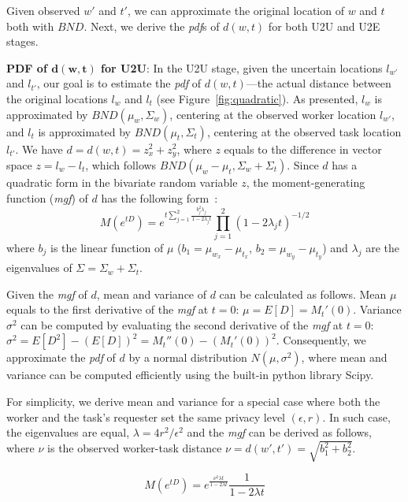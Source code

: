 \documentclass{USC-Thesis}
\numberwithin{equation}{chapter}
\begin{document}
Given observed $w'$ and $t'$, we can approximate the original location of $w$ and $t$ both with $\mathit{BND}$. Next, we derive the \emph{pdf}s of $d(w,t)$ for both U2U and U2E stages.

\textbf{PDF of $\mathbf{d(w,t)}$ for U2U}: In the U2U stage, given the uncertain locations $l_{w'}$ and $l_{t'}$, our goal is to estimate the \emph{pdf} of $d(w,t)$---the actual distance between the original locations $l_w$ and $l_t$  (see Figure~\ref{fig:quadratic}). As presented, $l_w$ is approximated by $\mathit{BND(\mu_w,\Sigma_w)}$, centering at the observed worker location $l_{w'}$, and  $l_t$ is approximated by $\mathit{BND(\mu_t,\Sigma_t)}$, centering at the observed task location $l_{t'}$. We have $d=d(w,t)=z_x^2+z_y^2$, where $z$ equals to the difference in vector space $z=l_w-l_t$, which follows $\mathit{BND(\mu_w-\mu_t,\Sigma_w+\Sigma_t)}$. Since $d$ has a quadratic form in the bivariate random variable $z$, the moment-generating function (\emph{mgf}) of $d$ has the following form~\cite{mathai1992quadratic}:
$$M(e^{tD})=e^{t\sum_{j=1}^2\frac{b_j^2\lambda_j}{1-2\lambda_j t}}\prod_{j=1}^2 (1-2\lambda_j t)^{-1/2}$$
where $b_j$ is the linear function of $\mu$ ($\mathit{b_1=\mu_{w_x}-\mu_{t_x}}$, $\mathit{b_2=\mu_{w_y}-\mu_{t_y}}$) and $\lambda_j$ are the eigenvalues of $\Sigma=\Sigma_w+\Sigma_t$.

Given the \emph{mgf} of $d$, mean and variance of $d$ can be calculated as follows.
Mean $\mu$ equals to the first derivative of the \emph{mgf} at $\mathit{t=0}$: $\mathit{\mu=E[D]=M_t'(0)}$. Variance $\sigma^2$ can be computed by evaluating the second derivative of the \emph{mgf} at $\mathit{t=0}$: $\mathit{\sigma^2=E[D^2]-(E[D])^2=M_t''(0)-(M_t'(0))^2}$.
Consequently, we approximate the \emph{pdf} of $d$ by a normal distribution $N(\mu,\sigma^2)$, where
mean and variance can be computed efficiently using the built-in python library Scipy.

For simplicity, we derive mean and variance for a special case where both the worker and the task's requester set the same privacy level $(\epsilon,r)$. In such case, the eigenvalues are equal, $\lambda=4r^2/\epsilon^2$ and the \emph{mgf} can be derived as follows, where $\nu$ is the observed worker-task distance $\nu=d(w',t')=\sqrt{b_1^2+b_2^2}$.

\begin{equation}
M(e^{tD})=e^{\frac{\nu^2\lambda t}{1-2\lambda t}}\frac{1}{1-2\lambda t}
\label{eq:mgf}
\end{equation}
\end{document}

